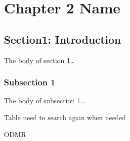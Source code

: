 \chapter{Chapter 2 Name}\label{ch2}


\section{Section1: Introduction}

The body of section 1\ldots

\subsection{Subsection 1}

The body of subsection 1\ldots

Table need to search again when needed

\ac{ODMR}